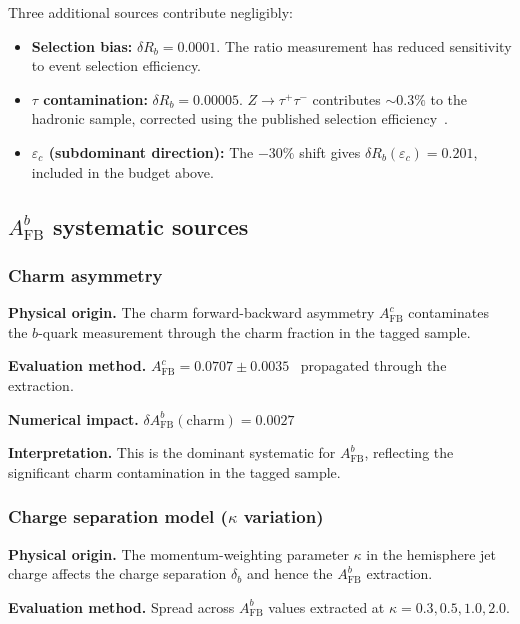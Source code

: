 \documentclass[11pt,a4paper]{article}
\begin{document}
Three additional sources contribute negligibly:
\begin{itemize}
\item \textbf{Selection bias:}
$\delta R_b = 0.0001$. The ratio measurement has reduced sensitivity
to event selection efficiency.
\item \textbf{$\tau$ contamination:}
$\delta R_b = 0.00005$. $Z \to \tau^+\tau^-$ contributes $\sim 0.3\%$ to the
hadronic sample, corrected using the published selection efficiency~\cite{ALEPH:sigma_had}.
\item \textbf{$\varepsilon_c$ (subdominant direction):} The $-30\%$ shift gives
$\delta R_b(\varepsilon_c) = 0.201$, included in the budget above.
\end{itemize}

\subsection{$A_\mathrm{FB}^b$ systematic sources}
\label{sec:syst_afb}

\subsubsection{Charm asymmetry}
\label{sec:syst_charm_asym}

\textbf{Physical origin.} The charm forward-backward asymmetry $A_\mathrm{FB}^c$ contaminates
the $b$-quark measurement through the charm fraction in the tagged sample.

\textbf{Evaluation method.} $A_\mathrm{FB}^c = 0.0707 \pm 0.0035$~\cite{LEP:EWWG:2005}
propagated through the extraction.

\textbf{Numerical impact.}
$\delta A_\mathrm{FB}^b(\mathrm{charm}) = 0.0027$

\textbf{Interpretation.} This is the dominant systematic for $A_\mathrm{FB}^b$,
reflecting the significant charm contamination in the tagged sample.

\subsubsection{Charge separation model ($\kappa$ variation)}
\label{sec:syst_kappa}

\textbf{Physical origin.} The momentum-weighting parameter $\kappa$ in the hemisphere
jet charge affects the charge separation $\delta_b$ and hence the $A_\mathrm{FB}^b$ extraction.

\textbf{Evaluation method.} Spread across $A_\mathrm{FB}^b$ values extracted at
$\kappa = 0.3, 0.5, 1.0, 2.0$.
\end{document}
